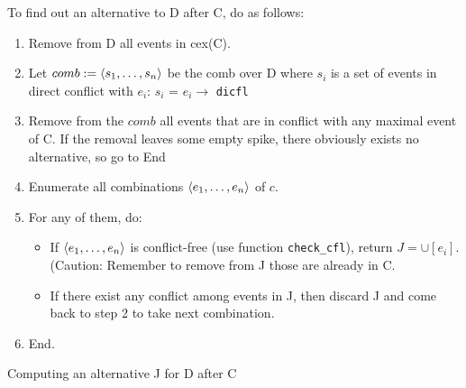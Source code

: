 \documentclass{llncs}
\begin{document}
\begin{algorithm}
To find out an alternative to D after C, do as follows:
\begin{enumerate}
	\item
	Remove from D all events in cex(C). 
	\item
	Let $comb \mathrel{:=} \langle s_1, \ldots, s_n\rangle$ be the comb over D where 
	$s_i$ is a set of events in direct conflict with $e_i$: $s_i$ = $e_i \rightarrow$ \verb!dicfl!
	\item
	Remove from the $comb$ all events that are in conflict with any maximal event of C. If the removal leaves some empty spike, 
	there obviously exists no alternative, so go to End
	\item
	Enumerate all combinations $\langle e_1, \ldots, e_n\rangle$ of $c$.
	\item
	For any of them, do:
	\begin{itemize}
		\item 
		If $\langle e_1, \ldots, e_n\rangle$ is conflict-free (use function \verb!check_cfl!), return $J = \cup [e_i]$. (Caution: Remember to remove from J those are already in C.
		\item
		If there exist any conflict among events in J, then discard J and come back to step 2
		to take next combination.
	\end{itemize}
	\item End.
\end{enumerate}
\caption{Computing an alternative J for D after C}
\label{a:alter}
\end{algorithm}
\end{document}
